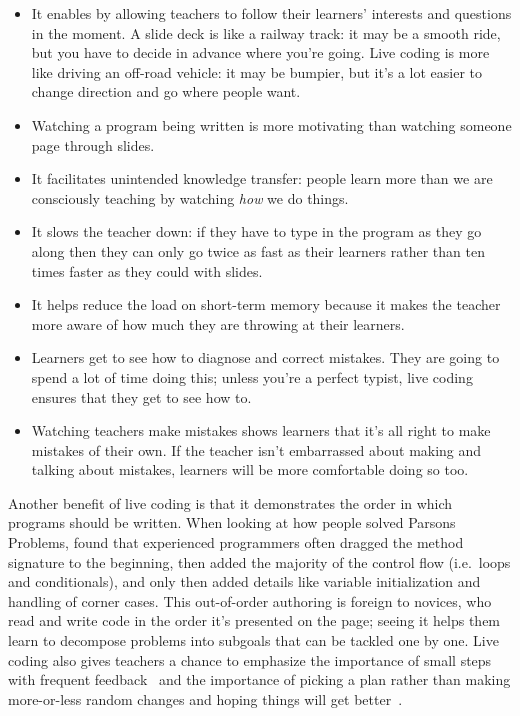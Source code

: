 \begin{itemize}

\item
  It enables 
  by allowing teachers to follow their learners' interests and questions in the moment.
  A slide deck is like a railway track:
  it may be a smooth ride,
  but you have to decide in advance where you're going.
  Live coding is more like driving an off-road vehicle:
  it may be bumpier,
  but it's a lot easier to change direction and go where people want.

\item
  Watching a program being written is more motivating
  than watching someone page through slides.

\item
  It facilitates unintended knowledge transfer:
  people learn more than we are consciously teaching
  by watching \emph{how} we do things.

\item
  It slows the teacher down:
  if they have to type in the program as they go along
  then they can only go twice as fast as their learners
  rather than ten times faster as they could with slides.

\item
  It helps reduce the load on short-term memory
  because it makes the teacher more aware of how much they are throwing at their learners.

\item
  Learners get to see how to diagnose and correct mistakes.
  They are going to spend a lot of time doing this;
  unless you're a perfect typist,
  live coding ensures that they get to see how to.

\item
  Watching teachers make mistakes shows learners that
  it's all right to make mistakes of their own.
  If the teacher isn't embarrassed about making and talking about mistakes,
  learners will be more comfortable doing so too.

\end{itemize}

Another benefit of live coding is that it demonstrates the order in which programs should be written.
When looking at how people solved Parsons Problems,
\cite{Ihan2011} found that experienced programmers often dragged the method signature to the beginning,
then added the majority of the control flow (i.e.\ loops and conditionals),
and only then added details like variable initialization and handling of corner cases.
This out-of-order authoring is foreign to novices,
who read and write code in the order it's presented on the page;
seeing it helps them learn to decompose problems into subgoals that can be tackled one by one.
Live coding also gives teachers a chance to emphasize the importance of small steps with frequent feedback~\cite{Blik2014}
and the importance of picking a plan
rather than making more-or-less random changes and hoping things will get better~\cite{Spoh1985}.

